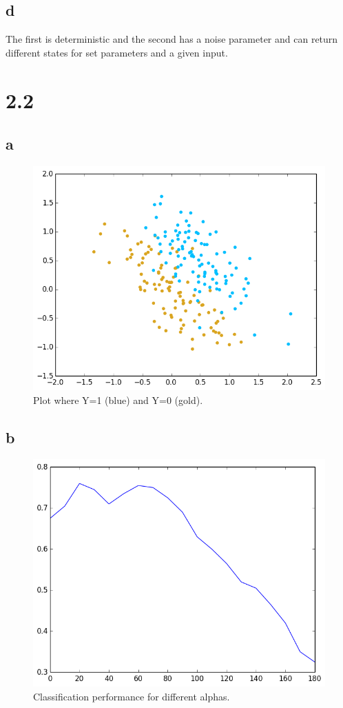 \documentclass[11pt,a4paper]{article}
\begin{document}
\subsection*{d}
The first is deterministic and the second has a noise parameter and can return different states for set parameters and a given
input.


\section*{2.2}
\subsection*{a}
\begin{figure}[h]
\centering
 \includegraphics[width=\textwidth]{./2_2_a.png}
\caption{Plot where Y=1 (blue) and Y=0 (gold).}
\end{figure}


\subsection*{b}
\begin{figure}[h]
\centering
 \includegraphics[width=\textwidth]{./2_2_b.png}
\caption{Classification performance for different alphas.}
\end{figure}
\end{document}
